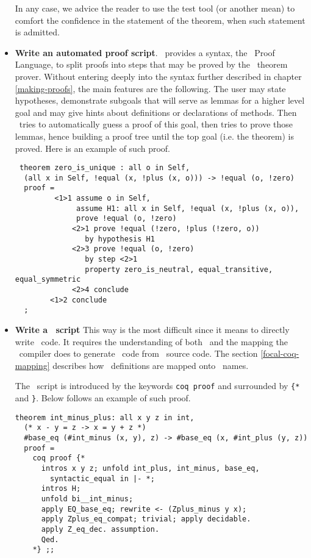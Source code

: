 \begin{itemize}
In any case,  we advice the reader to use
the test tool (or another mean) to comfort the confidence in the
statement of the theorem, when such statement is admitted.

\item {\bf Write an automated proof script}.  \focal\ provides a
  syntax, the \focal\ Proof Language, to split proofs into steps that
  may be proved by the \zenon\ theorem prover. Without entering deeply
  into the syntax further described in chapter \ref{making-proofs},
  the main features are the following. The user may state hypotheses,
  demonstrate subgoals that will serve as lemmas for a higher level
  goal and may give hints about definitions or declarations of
  methods. Then \zenon\ tries to automatically guess a proof of this
  goal, then tries to prove those lemmas, hence building a proof tree
  until the top goal (i.e. the theorem) is proved. Here is an
  example of such proof.

 {\scriptsize
\begin{lstlisting}
 theorem zero_is_unique : all o in Self,
  (all x in Self, !equal (x, !plus (x, o))) -> !equal (o, !zero)
  proof =
         <1>1 assume o in Self,
              assume H1: all x in Self, !equal (x, !plus (x, o)),
              prove !equal (o, !zero)
             <2>1 prove !equal (!zero, !plus (!zero, o))
                by hypothesis H1
             <2>3 prove !equal (o, !zero)
                by step <2>1
                property zero_is_neutral, equal_transitive, equal_symmetric
             <2>4 conclude
        <1>2 conclude
  ;
\end{lstlisting}
}

  \item {\bf Write a \coq\ script} This way is the most difficult
     since it means to directly write \coq\ code. It
    requires the understanding of both \coq\ and the mapping the
    \focal\ compiler does to generate \coq\ code from \focal\ source
    code. The section \ref{focal-coq-mapping} describes %
     how \focal\ definitions are mapped onto
    \coq\ names.

The \coq\ script is introduced by the keywords
    {\tt coq proof} and surrounded by {\tt \{*} and {\tt *\}}.
 Below follows an example of such proof.
{\scriptsize
\begin{lstlisting}
theorem int_minus_plus: all x y z in int,
  (* x - y = z -> x = y + z *)
  #base_eq (#int_minus (x, y), z) -> #base_eq (x, #int_plus (y, z))
  proof =
    coq proof {*
      intros x y z; unfold int_plus, int_minus, base_eq,
        syntactic_equal in |- *;
      intros H;
      unfold bi__int_minus;
      apply EQ_base_eq; rewrite <- (Zplus_minus y x);
      apply Zplus_eq_compat; trivial; apply decidable.
      apply Z_eq_dec. assumption.
      Qed.
    *} ;;
\end{lstlisting}
}
\end{itemize}



